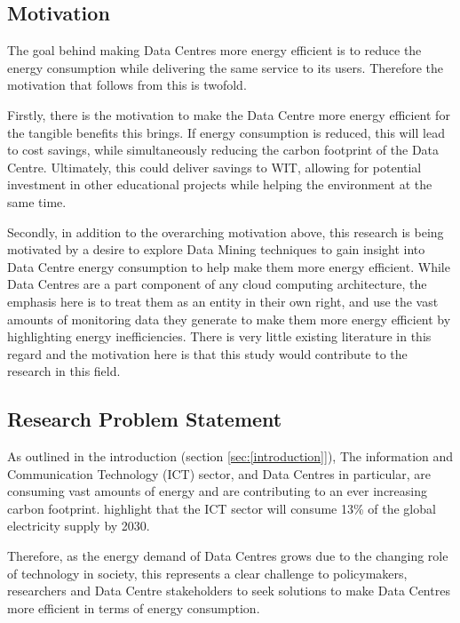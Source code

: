 \documentclass[12pt]{scrartcl}
\begin{document}
\subsection{Motivation}
\label{subsec:[Motivation]}
The goal behind making Data Centres more energy efficient is to reduce the energy consumption while delivering the same service to its users. Therefore the motivation that follows from this is twofold. 

Firstly, there is the motivation to make the Data Centre more energy efficient for the tangible benefits this brings. If energy consumption is reduced, this will lead to cost savings, while simultaneously reducing the carbon footprint of the Data Centre. Ultimately, this could deliver savings to WIT, allowing for potential investment in other educational projects while helping the environment at the same time. 

Secondly, in addition to the overarching motivation above, this research is being motivated by a desire to explore Data Mining techniques to gain insight into Data Centre energy consumption to help make them more energy efficient. While Data Centres are a part component of any cloud computing architecture, the emphasis here is to treat them as an entity in their own right, and use the vast amounts of monitoring data they generate to make them more energy efficient by highlighting energy inefficiencies. There is very little existing literature in this regard and the motivation here is that this study would contribute to the research in this field.  

\subsection{Research Problem Statement}
\label{subsec:[Research Problem Statement]}
As outlined in the introduction (section \ref{sec:[introduction]}), The information and Communication Technology (ICT) sector, and Data Centres in particular, are consuming vast amounts of energy and are contributing to an ever increasing carbon footprint.  \citet{edsbas.13818AC20170101} highlight that the ICT sector will consume 13\% of the global electricity supply by 2030. 

Therefore, as the energy demand of Data Centres grows due to the changing role of technology in society, this represents a clear challenge to policymakers, researchers and Data Centre stakeholders to seek solutions to make Data Centres more efficient in terms of energy consumption. 
\end{document}

